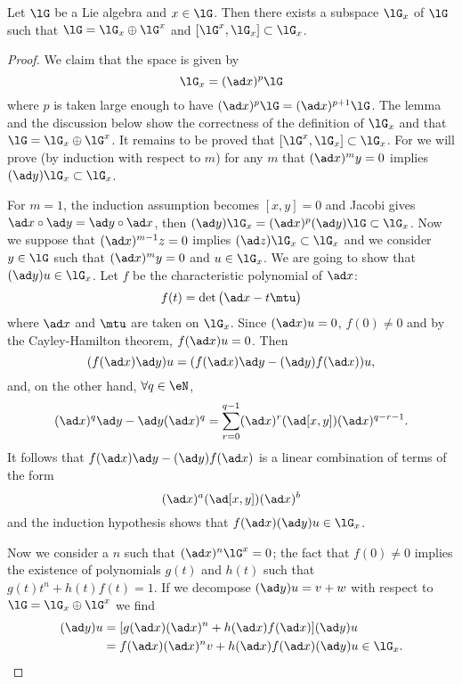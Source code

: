 \begin{proposition}
Let $\lG$ be a Lie algebra and $x\in\lG$. Then there exists a subspace $\lG_x$ of $\lG$ such that $\lG=\lG_x\oplus\lG^x$ and $[\lG^x,\lG_x]\subset\lG_x$.
\label{prop:G_x_G_x}
\end{proposition}

\begin{proof}
We claim that the space is given by 
\begin{equation}
\lG_x=(\ad x)^p\lG
\end{equation}
where $p$ is taken large enough to have $(\ad x)^p\lG=(\ad x)^{p+1}\lG$. The lemma and the discussion below show the correctness of the definition of $\lG_x$ and that $\lG=\lG_x\oplus\lG^x$. It remains to be proved that $[\lG^x,\lG_x]\subset\lG_x$. For we will prove (by induction with respect to $m$) for any $m$ that $(\ad x)^my=0$ implies $(\ad y)\lG_x\subset\lG_x$.

For $m=1$, the induction assumption becomes $[x,y]=0$ and Jacobi gives $\ad x\circ\ad y=\ad y\circ\ad x$, then $(\ad y)\lG_x=(\ad x)^p(\ad y)\lG\subset\lG_x$. Now we suppose that $(\ad x)^{m-1}z=0$ implies $(\ad z)\lG_x\subset\lG_x$ and we consider $y\in\lG$ such that $(\ad x)^my=0$ and $u\in\lG_x$. We are going to show that $(\ad y)u\in\lG_x$. Let $f$ be the characteristic polynomial of $\ad x$: 
\[
f(t)=\det\big( \ad x-t\mtu \big)
\]
where $\ad x$ and $\mtu$ are taken on $\lG_x$. Since $(\ad x)u=0$, $f(0)\neq 0$ and by the Cayley-Hamilton theorem, $f(\ad x)u=0$. Then
\begin{equation}
( f(\ad x)\ad y )u=(  f(\ad x)\ad y-(\ad y)f(\ad x)   )u,
\end{equation}
and, on the other hand, $\forall q\in\eN$,
\[
(\ad x)^q\ad y-\ad y(\ad x)^q=\sum_{r=0}^{q-1}(\ad x)^r(\ad[x,y])(\ad x)^{q-r-1}.
\]
It follows that $f(\ad x)\ad y-(\ad y)f(\ad x)$ is a linear combination of terms of the form 
\[
(\ad x)^a(\ad[x,y])(\ad x)^b
\]
and the induction hypothesis shows that $f(\ad x)(\ad y)u\in\lG_x$.

Now we consider a $n$ such that $(\ad x)^n\lG^x=0$; the fact that $f(0)\neq 0$ implies the existence of polynomials $g(t)$ and $h(t)$ such that $g(t)t^n+h(t)f(t)=1$. If we decompose $(\ad y)u=v+w$ with respect to $\lG=\lG_x\oplus\lG^x$ we find
\begin{equation}
\begin{split}
(\ad y)u&=[ g(\ad x)(\ad x)^n+h(\ad x)f(\ad x) ](\ad y)u\\
&=f(\ad x)(\ad x)^nv+h(\ad x)f(\ad x)(\ad y)u\in\lG_x.
\end{split}
\end{equation}

\end{proof}

